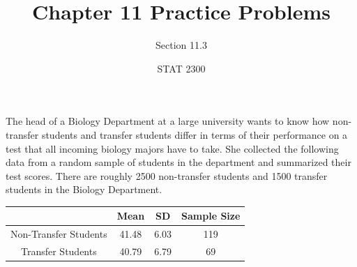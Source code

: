 \documentclass[noanswers]{exam}
\title{Chapter 11 Practice Problems}
\author{Section 11.3}
\date{STAT 2300}
\begin{document}
%

\begin{questions} 

\question The head of a Biology Department at a large university wants to know how non-transfer students and transfer students differ in terms of their performance on a test that all incoming biology majors have to take. She collected the following data from a random sample of students in the department and summarized their test scores. There are roughly 2500 non-transfer students and 1500 transfer students in the Biology Department.

\begin{center}
\begin{tabular}{c|c|c|c}
 & \textbf{Mean} & \textbf{SD} & \textbf{Sample Size}\\
\hline
Non-Transfer Students & 41.48 & 6.03 & 119 \\
\hline
Transfer Students & 40.79 & 6.79 & 69
\end{tabular}
\end{center}

\end{questions}
\end{document}
